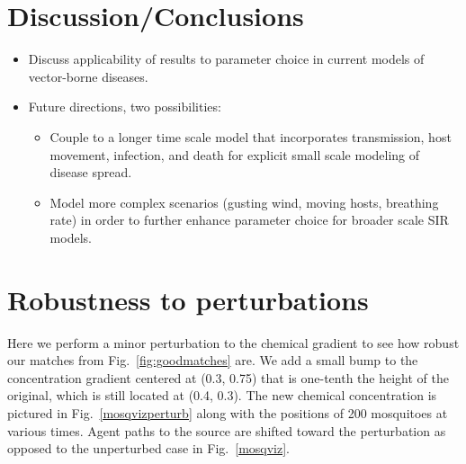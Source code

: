 \documentclass[12pt]{article}
\begin{document}
	\section{Discussion/Conclusions}
	\begin{itemize}
		\item Discuss applicability of results to parameter choice in current models of vector-borne diseases.
		\item Future directions, two possibilities:
		\begin{itemize}
			\item Couple to a longer time scale model that incorporates transmission, host movement, infection, and death for explicit small scale modeling of disease spread.
			\item Model more complex scenarios (gusting wind, moving hosts, breathing rate) in order to further enhance parameter choice for broader scale SIR models.
		\end{itemize}
	\end{itemize}


\appendix 

\section{Robustness to perturbations}\label{app:perturb}

Here we perform a minor perturbation to the chemical gradient to see how robust our matches from Fig.~\ref{fig:goodmatches} are. We add a small bump to the concentration gradient centered at (0.3, 0.75) that is one-tenth the height of the original, which is still located at (0.4, 0.3). The new chemical concentration is pictured in Fig.~\ref{mosqvizperturb} along with the positions of 200 mosquitoes at various times. Agent paths to the source are shifted toward the perturbation as opposed to the unperturbed case in Fig.~\ref{mosqviz}.
\end{document}
